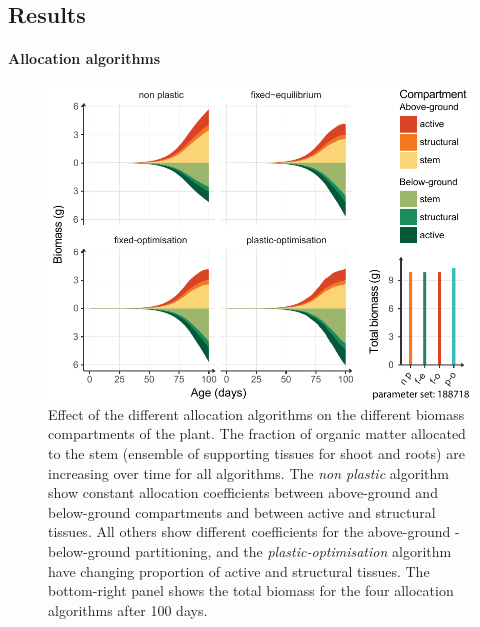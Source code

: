 \subsection{Results}

\paragraph{Allocation algorithms}

\begin{figure}\label{fig:allocation}
\includegraphics[width = \textwidth]{./2_PP/Figures/Individual/allocation_rules.pdf}
\caption[Effect of the different allocation algorithms on the different biomass compartments]{Effect of the different allocation algorithms on the different biomass compartments of the plant. The fraction of organic matter allocated to the stem (ensemble of supporting tissues for shoot and roots) are increasing over time for all algorithms. The \textit{non plastic} algorithm show constant allocation coefficients between above-ground and below-ground compartments and between active and structural tissues. All others show different coefficients for the above-ground - below-ground partitioning, and the \textit{plastic-optimisation} algorithm have changing proportion of active and structural tissues. The bottom-right panel shows the total biomass for the four allocation algorithms after 100 days. }
\end{figure}



